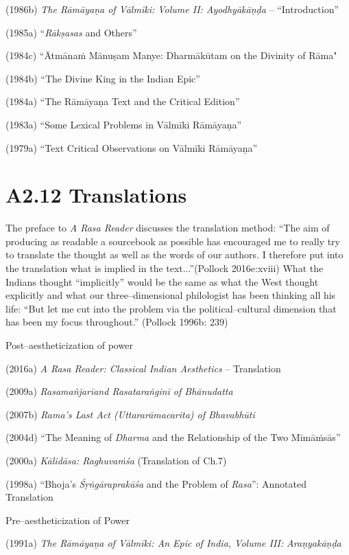 (1986b) \textit{The Rāmāyaṇa of Vālmīki: Volume II: Ayodhyākāṇḍa} – “Introduction”

(1985a) “\textit{Rākṣasas} and Others”

(1984c) “Ātmānaṁ Mānuṣam Manye: Dharmākūtam on the Divinity of Rāma"

(1984b) “The Divine King in the Indian Epic”

(1984a) “The Rāmāyaṇa Text and the Critical Edition”

(1983a) “Some Lexical Problems in Vālmīki Rāmāyaṇa”

(1979a) “Text Critical Observations on Vālmīki Rāmāyaṇa”

\vspace{-.3cm}

\section*{A2.12 Translations}

The preface to \textit{A Rasa Reader} discusses the translation method: “The aim of producing as readable a sourcebook as possible has encouraged me to really try to translate the thought as well as the words of our authors. I therefore put into the translation what is implied in the text...”(Pollock 2016e:xviii)  What the Indians thought “implicitly” would be the same as what the West thought explicitly and what our three–dimensional philologist has been thinking all his life: “But let me cut into the problem via the political–cultural dimension that has been my focus throughout.” (Pollock 1996b: 239)

Post–aestheticization of power

(2016a) \textit{A Rasa Reader: Classical Indian Aesthetics} – Translation

(2009a) \textit{Rasamañjarīand Rasataraṅginī of Bhānudatta}

(2007b) \textit{Rama's Last Act (Uttararāmacarita) of Bhavabhūti}

(2004d) “The Meaning of \textit{Dharma} and the Relationship of the Two Mīmāṁsās”

(2000a) \textit{Kālidāsa: Raghuvaṁśa} (Translation of Ch.7)

(1998a) “Bhoja's \textit{Śṛṅgāraprakāśa} and the Problem of \textit{Rasa}”: Annotated Translation

Pre–aestheticization of Power

(1991a) \textit{The Rāmāyaṇa of Vālmīki: An Epic of India, Volume III: Araṇyakāṇḍa}

